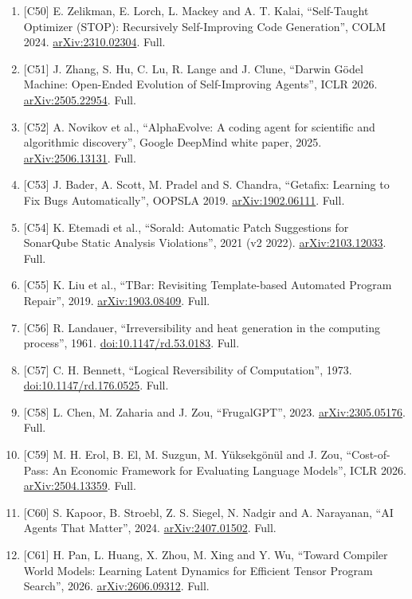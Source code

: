 \documentclass[10pt,letterpaper]{article}
\begin{document}
\begin{enumerate}
\item
  {[}C50{]} E. Zelikman, E. Lorch, L. Mackey and A. T. Kalai,
  ``Self-Taught Optimizer (STOP): Recursively Self-Improving Code
  Generation'', COLM 2024.
  \href{https://arxiv.org/abs/2310.02304}{arXiv:2310.02304}. Full.
\item
  {[}C51{]} J. Zhang, S. Hu, C. Lu, R. Lange and J. Clune, ``Darwin
  Gödel Machine: Open-Ended Evolution of Self-Improving Agents'', ICLR
  2026. \href{https://arxiv.org/abs/2505.22954}{arXiv:2505.22954}. Full.
\item
  {[}C52{]} A. Novikov et al., ``AlphaEvolve: A coding agent for
  scientific and algorithmic discovery'', Google DeepMind white paper,
  2025. \href{https://arxiv.org/abs/2506.13131}{arXiv:2506.13131}. Full.
\item
  {[}C53{]} J. Bader, A. Scott, M. Pradel and S. Chandra, ``Getafix:
  Learning to Fix Bugs Automatically'', OOPSLA 2019.
  \href{https://arxiv.org/abs/1902.06111}{arXiv:1902.06111}. Full.
\item
  {[}C54{]} K. Etemadi et al., ``Sorald: Automatic Patch Suggestions for
  SonarQube Static Analysis Violations'', 2021 (v2 2022).
  \href{https://arxiv.org/abs/2103.12033}{arXiv:2103.12033}. Full.
\item
  {[}C55{]} K. Liu et al., ``TBar: Revisiting Template-based Automated
  Program Repair'', 2019.
  \href{https://arxiv.org/abs/1903.08409}{arXiv:1903.08409}. Full.
\item
  {[}C56{]} R. Landauer, ``Irreversibility and heat generation in the
  computing process'', 1961.
  \href{https://doi.org/10.1147/rd.53.0183}{doi:10.1147/rd.53.0183}.
  Full.
\item
  {[}C57{]} C. H. Bennett, ``Logical Reversibility of Computation'',
  1973.
  \href{https://doi.org/10.1147/rd.176.0525}{doi:10.1147/rd.176.0525}.
  Full.
\item
  {[}C58{]} L. Chen, M. Zaharia and J. Zou, ``FrugalGPT'', 2023.
  \href{https://arxiv.org/abs/2305.05176}{arXiv:2305.05176}. Full.
\item
  {[}C59{]} M. H. Erol, B. El, M. Suzgun, M. Yüksekgönül and J. Zou,
  ``Cost-of-Pass: An Economic Framework for Evaluating Language
  Models'', ICLR 2026.
  \href{https://arxiv.org/abs/2504.13359}{arXiv:2504.13359}. Full.
\item
  {[}C60{]} S. Kapoor, B. Stroebl, Z. S. Siegel, N. Nadgir and A.
  Narayanan, ``AI Agents That Matter'', 2024.
  \href{https://arxiv.org/abs/2407.01502}{arXiv:2407.01502}. Full.
\item
  {[}C61{]} H. Pan, L. Huang, X. Zhou, M. Xing and Y. Wu, ``Toward
  Compiler World Models: Learning Latent Dynamics for Efficient Tensor
  Program Search'', 2026.
  \href{https://arxiv.org/abs/2606.09312}{arXiv:2606.09312}. Full.
\end{enumerate}
\end{document}

